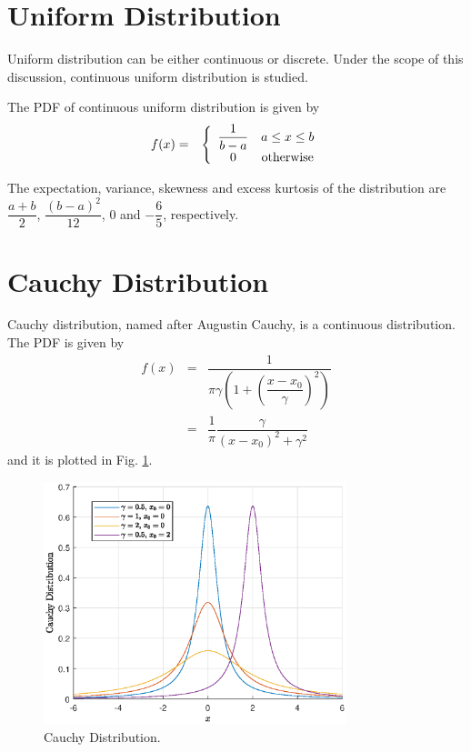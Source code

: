 \section{Uniform Distribution}

Uniform distribution can be either continuous or discrete. Under the scope of this discussion, continuous uniform distribution is studied.

The PDF of continuous uniform distribution is given by
\begin{eqnarray}
	f(x) &=& \left\{\begin{array}{cc}
		\dfrac{1}{b-a} & a \leq x \leq b \\
		0 & \textup{otherwise}
	\end{array}\right. \nonumber
\end{eqnarray}

The expectation, variance, skewness and excess kurtosis of the distribution are $\dfrac{a+b}{2}$, $\dfrac{(b-a)^2}{12}$, $0$ and $-\dfrac{6}{5}$, respectively.

\section{Cauchy Distribution}

Cauchy distribution, named after Augustin Cauchy, is a continuous distribution. The PDF is given by
\begin{eqnarray}
	f(x) &=& \dfrac{1}{\pi\gamma\left(1+\left(\dfrac{x-x_0}{\gamma}\right)^2\right)} \nonumber \\ &=& \dfrac{1}{\pi}\dfrac{\gamma}{(x-x_0)^2+\gamma^2} \nonumber
\end{eqnarray}
and it is plotted in Fig. \ref{fig:cauchy_pdf}.

\begin{figure}[!htb]
	\centering
	\includegraphics[width=250pt]{chapters/part-1/figures/cauchy_pdf.eps}
	\caption{Cauchy Distribution.} \label{fig:cauchy_pdf}
\end{figure}

